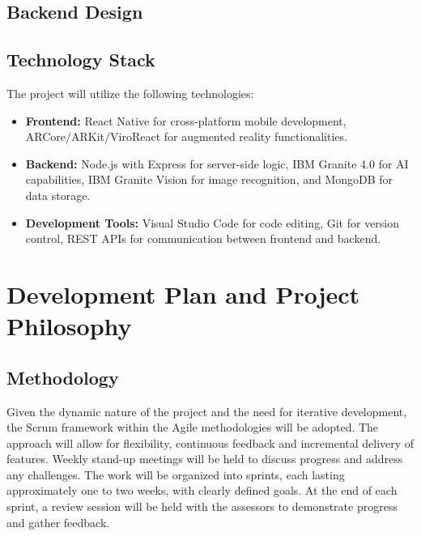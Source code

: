 \documentclass[12pt]{article}
\begin{document}
    \subsection{Backend Design}

        \subsubsection{}

        \subsubsection{}

        \subsubsection{}

    \subsection{Technology Stack}
        The project will utilize the following technologies:
        \begin{itemize}
            \item \textbf{Frontend:} React Native for cross-platform mobile development, ARCore/ARKit/ViroReact for augmented reality functionalities.
            \item \textbf{Backend:} Node.js with Express for server-side logic, IBM Granite 4.0 for AI capabilities, IBM Granite Vision for image recognition, and MongoDB for data storage.
            \item \textbf{Development Tools:} Visual Studio Code for code editing, Git for version control, REST APIs for communication between frontend and backend.
        \end{itemize}

\section{Development Plan and Project Philosophy}

    \subsection{Methodology}

    Given the dynamic nature of the project and the need for iterative development, the Scrum framework within the Agile methodologies will be adopted. The approach will allow for flexibility, continuous feedback
    and incremental delivery of features. Weekly stand-up meetings will be held to discuss progress and address any challenges. The work will be organized into sprints, each lasting approximately one to two weeks,
    with clearly defined goals. At the end of each sprint, a review session will be held with the assessors to demonstrate progress and gather feedback.
\end{document}
